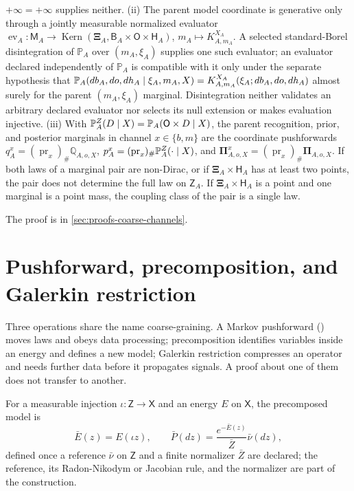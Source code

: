 $+\infty=+\infty$ supplies neither. (ii) The parent model coordinate is generative only through a
jointly measurable normalized evaluator
$\operatorname{ev}_A:\mathsf M_A\to\operatorname{Kern}(\boldsymbol\Xi_A,\mathsf B_A\times\mathsf
O\times\mathsf H_A)$, $m_A\mapsto K^{X_A}_{A,m_A}$. A selected standard-Borel disintegration of
$\mathbb P_A$ over $(m_A,\xi_A)$ supplies one such evaluator; an evaluator declared independently of
$\mathbb P_A$ is compatible with it only under the separate hypothesis that
$\mathbb P_A(db_A,do,dh_A\mid\xi_A,m_A,X)=K^{X_A}_{A,m_A}(\xi_A;db_A,do,dh_A)$ almost surely for
the parent $(m_A,\xi_A)$ marginal. Disintegration neither validates an arbitrary declared
evaluator nor selects its null extension or makes evaluation injective. (iii) With
$\mathbb P^Z_A(D\mid X)=\mathbb P_A(\mathsf O\times D\mid X)$, the parent recognition, prior, and
posterior marginals in channel $x\in\{b,m\}$ are the coordinate pushforwards
$q_A^x=(\operatorname{pr}_x)_\#\mathbb Q_{A,o,X}$,
$p_A^x=(\operatorname{pr}_x)_\#\mathbb P^Z_A(\cdot\mid X)$, and
$\boldsymbol\Pi^x_{A,o,X}=(\operatorname{pr}_x)_\#\boldsymbol\Pi_{A,o,X}$. If both laws of a
marginal pair are non-Dirac, or if $\boldsymbol\Xi_A\times\mathsf H_A$ has at least two points, the
pair does not determine the full law on $\mathsf Z_A$. If $\boldsymbol\Xi_A\times\mathsf H_A$ is a
point and one marginal is a point mass, the coupling class of the pair is a single law.

The proof is in \cref{sec:proofs-coarse-channels}.

\section{Pushforward, precomposition, and Galerkin restriction}
\label{sec:cg-three-operations}

Three operations share the name coarse-graining. A Markov pushforward
() moves laws and obeys data processing; precomposition identifies
variables inside an energy and defines a new model; Galerkin restriction compresses an operator and
needs further data before it propagates signals. A proof about one of them does not transfer to
another.

For a measurable injection $\iota:\mathsf Z\to\mathsf X$ and an energy $E$ on $\mathsf X$, the
precomposed model is
\begin{equation}
\bar E(z)=E(\iota z),
\qquad
\bar P(dz)=\frac{e^{-\bar E(z)}}{\bar Z}\bar\nu(dz),
\label{eq:cg-energy-precomposition}
\end{equation}
defined once a reference $\bar\nu$ on $\mathsf Z$ and a finite normalizer $\bar Z$ are declared;
the reference, its Radon-Nikodym or Jacobian rule, and the normalizer are part of the construction.


